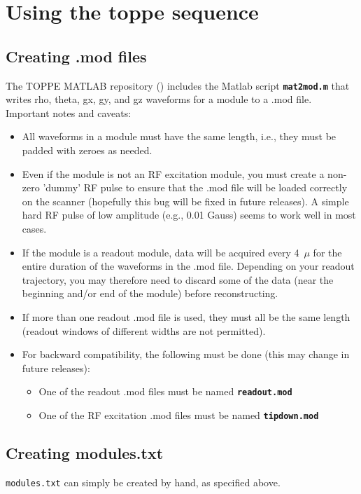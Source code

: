 
\chapter{Using the toppe sequence}



\section{Creating .mod files}
The TOPPE MATLAB repository (\matrep) includes the Matlab script {\tt \bf mat2mod.m} that writes rho, theta, gx, gy, and gz waveforms for a module to a .mod file.
Important notes and caveats:
\begin{itemize}
\item All waveforms in a module must have the same length, i.e., they must be padded with zeroes as needed.
\item Even if the module is not an RF excitation module, you must create a non-zero 'dummy' RF pulse to ensure that the .mod file will be loaded correctly on the scanner (hopefully this bug will be fixed in future releases). A simple hard RF pulse of low amplitude (e.g., 0.01 Gauss) seems to work well in most cases.
\item If the module is a readout module, data will be acquired every 4~$\mu$ for the entire duration of the waveforms in the .mod file. Depending on your readout trajectory, you may therefore need to discard some of the data (near the beginning and/or end of the module) before reconstructing.
\item If more than one readout .mod file is used, they must all be the same length (readout windows of different widths are not permitted).
\item For backward compatibility, the following must be done (this may change in future releases):
\begin{itemize}
	\item One of the readout .mod files must be named {\tt \bf readout.mod} 
	\item One of the RF excitation .mod files must be named {\tt \bf tipdown.mod} 
\end{itemize}
\end{itemize}


\section{Creating modules.txt}
{\tt modules.txt} can simply be created by hand, as specified above.


